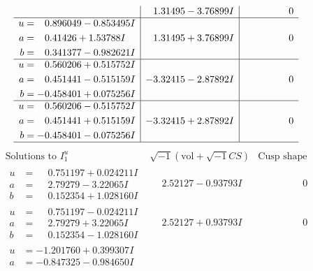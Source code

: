 \documentclass[1p]{elsarticle_modified}
\theoremstyle{definition}
\newcommand{\I}{\sqrt{-1}}
\begin{document}
$$\begin{array}{c|c|c}
 & \phantom{-}1.31495 - 3.76899 I & \phantom{-0.000000 } 0 \\ \hline\begin{aligned}
u &= \phantom{-}0.896049 - 0.853495 I \\
a &= \phantom{-}0.41426 + 1.53788 I \\
b &= \phantom{-}0.341377 - 0.982621 I\end{aligned}
 & \phantom{-}1.31495 + 3.76899 I & \phantom{-0.000000 } 0 \\ \hline\begin{aligned}
u &= \phantom{-}0.560206 + 0.515752 I \\
a &= \phantom{-}0.451441 - 0.515159 I \\
b &= -0.458401 + 0.075256 I\end{aligned}
 & -3.32415 - 2.87892 I & \phantom{-0.000000 } 0 \\ \hline\begin{aligned}
u &= \phantom{-}0.560206 - 0.515752 I \\
a &= \phantom{-}0.451441 + 0.515159 I \\
b &= -0.458401 - 0.075256 I\end{aligned}
 & -3.32415 + 2.87892 I & \phantom{-0.000000 } 0\\
 \hline 
 \end{array}$$\newpage$$\begin{array}{c|c|c}  
\text{Solutions to }I^u_{1}& \I (\text{vol} + \sqrt{-1}CS) & \text{Cusp shape}\\
 \hline 
\begin{aligned}
u &= \phantom{-}0.751197 + 0.024211 I \\
a &= \phantom{-}2.79279 - 3.22065 I \\
b &= \phantom{-}0.152354 + 1.028160 I\end{aligned}
 & \phantom{-}2.52127 - 0.93793 I & \phantom{-0.000000 } 0 \\ \hline\begin{aligned}
u &= \phantom{-}0.751197 - 0.024211 I \\
a &= \phantom{-}2.79279 + 3.22065 I \\
b &= \phantom{-}0.152354 - 1.028160 I\end{aligned}
 & \phantom{-}2.52127 + 0.93793 I & \phantom{-0.000000 } 0 \\ \hline\begin{aligned}
u &= -1.201760 + 0.399307 I \\
a &= -0.847325 - 0.984650 I \\

\end{aligned}
\end{array}$$
\end{document}

